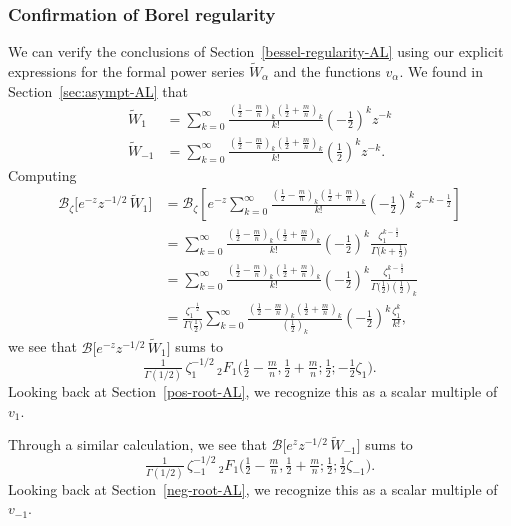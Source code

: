\documentclass{article}
\newcommand{\borel}{\mathcal{B}}
\theoremstyle{definition}
\theoremstyle{plain}
\begin{document}
\subsubsection{Confirmation of Borel regularity}\label{confirmation-borel-regularity}
%
We can verify the conclusions of Section~\ref{bessel-regularity-AL} using our explicit expressions for the formal power series $\tilde{W}_\alpha$ and the functions $v_\alpha$. We found in Section~\ref{sec:asympt-AL} that
\begin{align*}
\tilde{W}_1 & = \sum_{k = 0}^{\infty} \frac{\left(\tfrac{1}{2}-\tfrac{m}{n}\right)_k \left(\tfrac{1}{2}+\tfrac{m}{n}\right)_k}{k!} \left(-\frac{1}{2}\right)^k z^{-k} \\
\tilde{W}_{-1} & = \sum_{k = 0}^{\infty} \frac{\left(\tfrac{1}{2}-\tfrac{m}{n}\right)_k \left(\tfrac{1}{2}+\tfrac{m}{n}\right)_k}{k!} \left(\frac{1}{2}\right)^k z^{-k}.
\end{align*}
Computing
\begin{align*}
\borel_\zeta \big[ e^{-z} z^{-1/2}\,\tilde{W}_1 \big] & = \borel_\zeta \left[ e^{-z} \sum_{k = 0}^{\infty} \frac{\left(\tfrac{1}{2}-\tfrac{m}{n}\right)_k \left(\tfrac{1}{2}+\tfrac{m}{n}\right)_k}{k!} \left(-\frac{1}{2}\right)^k z^{-k-\frac{1}{2}} \right] \\
& = \sum_{k = 0}^{\infty} \frac{\left(\tfrac{1}{2}-\tfrac{m}{n}\right)_k \left(\tfrac{1}{2}+\tfrac{m}{n}\right)_k}{k!} \left(-\frac{1}{2}\right)^k \frac{\zeta_1^{k-\frac{1}{2}}}{\Gamma\big(k+\frac{1}{2}\big)} \\
& = \sum_{k = 0}^{\infty} \frac{\left(\tfrac{1}{2}-\tfrac{m}{n}\right)_k \left(\tfrac{1}{2}+\tfrac{m}{n}\right)_k}{k!} \left(-\frac{1}{2}\right)^k \frac{\zeta_1^{k-\frac{1}{2}}}{\Gamma\big(\frac{1}{2}\big) \left(\frac{1}{2}\right)_k} \\
& = \frac{\zeta_1^{-\frac{1}{2}}}{\Gamma\big(\frac{1}{2}\big)} \sum_{k = 0}^{\infty} \frac{\left(\tfrac{1}{2}-\tfrac{m}{n}\right)_k \left(\tfrac{1}{2}+\tfrac{m}{n}\right)_k}{\left(\frac{1}{2}\right)_k} \left(-\frac{1}{2}\right)^k \frac{\zeta_1^k}{k!},
\end{align*}
we see that $\borel\big[ e^{-z} z^{-1/2}\,\tilde{W}_1 \big]$ sums to
\[ \tfrac{1}{\Gamma(1/2)}\,\zeta_1^{-1/2}\,{}_2F_1\big(\tfrac{1}{2}-\tfrac{m}{n}, \tfrac{1}{2}+\tfrac{m}{n}; \tfrac{1}{2}; -\tfrac{1}{2}\zeta_1\big). \]
Looking back at Section~\ref{pos-root-AL}, we recognize this as a scalar multiple of $v_1$.

Through a similar calculation, we see that $\borel\big[ e^z z^{-1/2}\,\tilde{W}_{-1} \big]$ sums to
\[ \tfrac{1}{\Gamma(1/2)}\,\zeta_{-1}^{-1/2}\,{}_2F_1\big(\tfrac{1}{2}-\tfrac{m}{n}, \tfrac{1}{2}+\tfrac{m}{n}; \tfrac{1}{2}; \tfrac{1}{2}\zeta_{-1}\big). \]
Looking back at Section~\ref{neg-root-AL}, we recognize this as a scalar multiple of $v_{-1}$.
%
\end{document}
